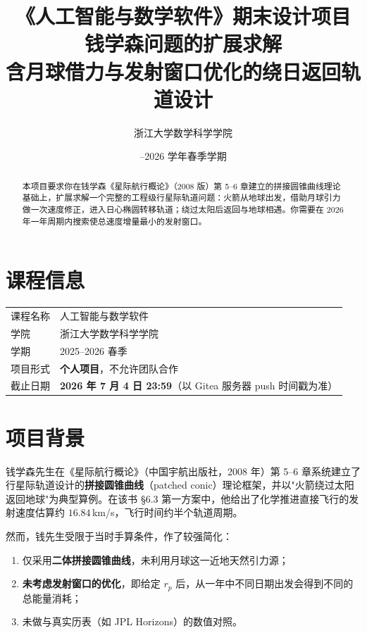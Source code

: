 \documentclass[11pt,a4paper]{ctexart}
\title{\heiti 《人工智能与数学软件》期末设计项目\\[8pt]
       \Large 钱学森问题的扩展求解\\
       \large 含月球借力与发射窗口优化的绕日返回轨道设计}
\author{\kaishu 浙江大学数学科学学院}
\date{\kaishu 2025--2026 学年春季学期}
\begin{document}
\maketitle

\begin{abstract}
\noindent 本项目要求你在钱学森《星际航行概论》（2008 版）第 5--6 章建立的拼接圆锥曲线理论基础上，扩展求解一个完整的工程级行星际轨道问题：火箭从地球出发，借助月球引力做一次速度修正，进入日心椭圆转移轨道；绕过太阳后返回与地球相遇。你需要在 2026 年一年周期内搜索使总速度增量最小的发射窗口。
\end{abstract}

\tableofcontents
\bigskip

\section{课程信息}

\begin{tabular}{@{}ll@{}}
课程名称   & 人工智能与数学软件 \\
学院       & 浙江大学数学科学学院 \\
学期       & 2025--2026 春季 \\
项目形式   & \textbf{个人项目}，不允许团队合作 \\
截止日期   & \textbf{2026 年 7 月 4 日 23:59}（以 Gitea 服务器 push 时间戳为准） \\
\end{tabular}

\section{项目背景}

钱学森先生在《星际航行概论》（中国宇航出版社，2008 年）第 5--6 章系统建立了行星际轨道设计的\textbf{拼接圆锥曲线}（patched conic）理论框架，并以"火箭绕过太阳返回地球"为典型算例。在该书 §6.3 第一方案中，他给出了化学推进直接飞行的发射速度估算约 $16.84$\,km/s，飞行时间约半个轨道周期。

然而，钱先生受限于当时手算条件，作了较强简化：

\begin{enumerate}[label=(\arabic*)]
    \item 仅采用\textbf{二体拼接圆锥曲线}，未利用月球这一近地天然引力源；
    \item \textbf{未考虑发射窗口的优化}，即给定 $r_p$ 后，从一年中不同日期出发会得到不同的总能量消耗；
    \item 未做与真实历表（如 JPL Horizons）的数值对照。
\end{enumerate}
\end{document}
